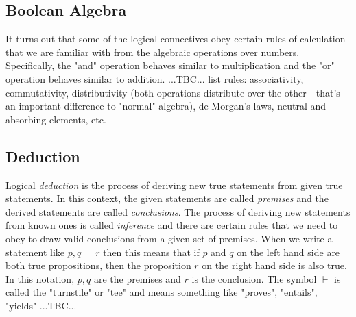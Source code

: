 
\subsection{Boolean Algebra}
It turns out that some of the logical connectives obey certain rules of calculation that we are familiar with from the algebraic operations over numbers. Specifically, the "and" operation behaves similar to multiplication and the "or" operation behaves similar to addition. ...TBC... list rules: associativity, commutativity, distributivity (both operations distribute over the other - that's an important difference to "normal" algebra), de Morgan's laws, neutral and absorbing elements, etc.

%





\subsection{Deduction}
Logical \emph{deduction} is the process of deriving new true statements from given true statements. In this context, the given statements are called \emph{premises} and the derived statements are called \emph{conclusions}. The process of deriving new statements from known ones is called \emph{inference} and there are certain rules that we need to obey to draw valid conclusions from a given set of premises. When we write a statement like $p,q \,\vdash\, r$ then this means that if $p$ and $q$ on the left hand side are both true propositions, then the proposition $r$ on the right hand side is also true. In this notation, $p,q$ are the premises and $r$ is the conclusion. The symbol $\vdash$ is called the "turnstile" or "tee" and means something like "proves", "entails", "yields"  ...TBC...

